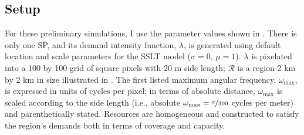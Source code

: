 \documentclass[12pt,dvipsnames]{report}
\begin{document}
\subsection{Setup} \label{subsec:prelim_setup}

For these preliminary simulations, I use the parameter values shown in .  There is only one SP, and its demand intensity function, $\lambda$, is generated using default location and scale parameters for the SSLT model ($\sigma = 0,\, \mu = 1$).  $\lambda$ is pixelated into a 100 by 100 grid of square pixels with 20 m side length; $\mathcal{R}$ is a region 2 km by 2 km in size illustrated in .  The first listed maximum angular frequency, $\omega_{\max}$, is expressed in units of cycles per pixel; in terms of absolute distance, $\omega_{\max}$ is scaled according to the side length (i.e., absolute $\omega_{\max} = \nicefrac{\pi}{300}$ cycles per meter) and parenthetically stated.  Resources are homogeneous and constructed to satisfy the region's demands both in terms of coverage and capacity.
\end{document}
